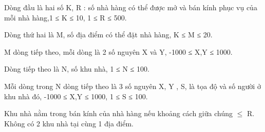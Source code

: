 Dòng đầu là hai số K, R : số nhà hàng có thể được mở và bán kính phục vụ của mỗi nhà hàng,1 ≤ K ≤ 10, 1 ≤ R ≤ 500.  

   Dòng thứ hai là M, số địa điểm có thể đặt nhà hàng, K ≤ M ≤ 20.  

   M dòng tiếp theo, mỗi dòng là 2 số nguyên X và Y, -1000 ≤ X,Y ≤ 1000.  

   Dòng tiếp theo là N, số khu nhà, 1 ≤ N ≤ 100.  

   Mỗi dòng trong N dòng tiếp theo là 3 số nguyên  X, Y , S,  là tọa độ và số người ở khu nhà đó, -1000 ≤ X,Y ≤ 1000, 1 ≤ S ≤ 100.  

   Khu nhà nằm trong bán kính của nhà hàng nếu khoảng cách giữa chúng  $\le$  R. Không có 2 khu nhà tại cùng 1 địa điểm.  



\